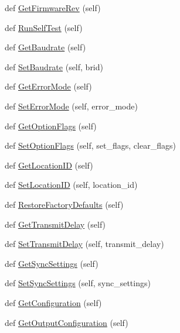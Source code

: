 \begin{DoxyCompactItemize}
def \hyperlink{classmtdevice_1_1MTDevice_a1f31e322a4232994ac49fb641f3d3cc0}{Get\+Firmware\+Rev} (self)
\item 
def \hyperlink{classmtdevice_1_1MTDevice_a259fb7d60c601ebe00e539c9a96ec9f7}{Run\+Self\+Test} (self)
\item 
def \hyperlink{classmtdevice_1_1MTDevice_a815cba09b30c67bec0c1405dc916cf96}{Get\+Baudrate} (self)
\item 
def \hyperlink{classmtdevice_1_1MTDevice_ac964b061548751f4885b12dc01a0a0f7}{Set\+Baudrate} (self, brid)
\item 
def \hyperlink{classmtdevice_1_1MTDevice_af7939b8d550d4016f3078a5e8ea80020}{Get\+Error\+Mode} (self)
\item 
def \hyperlink{classmtdevice_1_1MTDevice_a9f8b2a581a49333421f371ea1403b953}{Set\+Error\+Mode} (self, error\+\_\+mode)
\item 
def \hyperlink{classmtdevice_1_1MTDevice_ad4de7b6d2e4e8e033e2ac7f998554537}{Get\+Option\+Flags} (self)
\item 
def \hyperlink{classmtdevice_1_1MTDevice_adf0f4d946d65c78dcf641d9b7dd2c9e0}{Set\+Option\+Flags} (self, set\+\_\+flags, clear\+\_\+flags)
\item 
def \hyperlink{classmtdevice_1_1MTDevice_abc9c9bc4f9e83745b2d34df960050efa}{Get\+Location\+ID} (self)
\item 
def \hyperlink{classmtdevice_1_1MTDevice_a82701d9577a6bf7323b9a5649bebe4e0}{Set\+Location\+ID} (self, location\+\_\+id)
\item 
def \hyperlink{classmtdevice_1_1MTDevice_a1b86412ad2c180bcfd6bbf4ea62f76a4}{Restore\+Factory\+Defaults} (self)
\item 
def \hyperlink{classmtdevice_1_1MTDevice_a7e0df33d903e96c8beaf7f136075cff1}{Get\+Transmit\+Delay} (self)
\item 
def \hyperlink{classmtdevice_1_1MTDevice_a439b399cd20ca95cfad6225f368651f2}{Set\+Transmit\+Delay} (self, transmit\+\_\+delay)
\item 
def \hyperlink{classmtdevice_1_1MTDevice_af518193ff364835d40017be2a0fdde45}{Get\+Sync\+Settings} (self)
\item 
def \hyperlink{classmtdevice_1_1MTDevice_a339cd8bc34b6fa9c1f4dc7b8c8751576}{Set\+Sync\+Settings} (self, sync\+\_\+settings)
\item 
def \hyperlink{classmtdevice_1_1MTDevice_a2d75ac2afb3feded6ca6ac0fabb54aef}{Get\+Configuration} (self)
\item 
def \hyperlink{classmtdevice_1_1MTDevice_a14e52089e2cc376e2ac1c77283a348d1}{Get\+Output\+Configuration} (self)

\end{DoxyCompactItemize}
